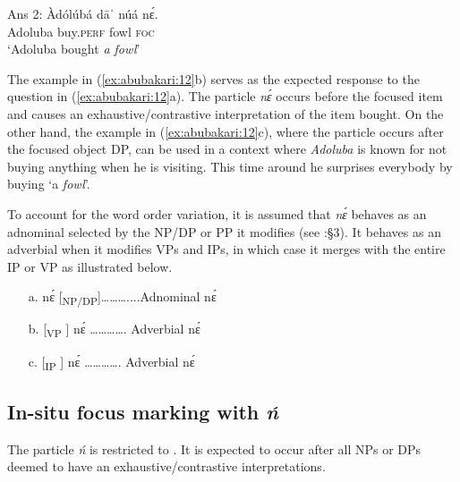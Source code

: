\documentclass[output=paper,modfonts,nonflat,
\ChapterDOI{10.5281/zenodo.3367154}
 hidelinks
]{langsci/langscibook}
\begin{document}
\ex\label{ex:abubakari:12c} 
Ans 2: \gll Àdólúbá  dāˈ    núá  nɛ́.\\
Adoluba  buy.\textsc{perf}  fowl  \textsc{foc}\\
\glt ‘Adoluba bought \textit{a fowl}’
\z
\z
 
The example in (\ref{ex:abubakari:12}b) serves as the expected response to the question in (\ref{ex:abubakari:12}a). The particle \textit{nɛ́} occurs before the focused item and causes an exhaustive{\slash}contrast\-ive interpretation of the item bought. On the other hand, the example in (\ref{ex:abubakari:12}c), where the particle occurs after the focused object DP, can be used in a context where \textit{Adoluba} is known for not buying anything when he is visiting. This time around he surprises everybody by buying ‘a \textit{fowl}’. 
 

To account for the word order variation, it is assumed that \textit{nɛ́} behaves as an adnominal selected by the NP/DP or PP it modifies (see \citealt{renans2016}:§3). It behaves as an adverbial when it modifies VPs and IPs, in which case it merges with the entire IP or VP as illustrated below. 

 
\begin{itemize}
\item[a.] nɛ́ [\textsubscript{NP/DP}]………....Adnominal nɛ́
\item[b.] [\textsubscript{VP} ] nɛ́ …………. Adverbial nɛ́ 
\item[c.]  [\textsubscript{IP} ] nɛ́ …………. Adverbial nɛ́ 
\end{itemize}

\subsection{In-situ focus marking with \textit{ń}}

The particle \textit{ń} is restricted to  . It is expected to occur after all  NPs or DPs deemed to have an exhaustive{\slash}contrastive  interpretations.
\end{document}
